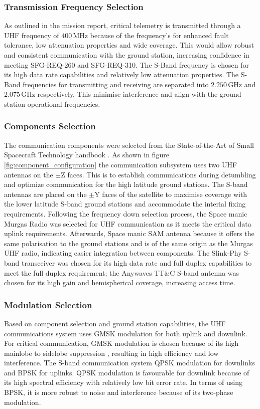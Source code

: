 \documentclass[a4paper, 11pt, conference]{IEEEtran}
\begin{document}
\subsubsection{Transmission Frequency Selection}
As outlined in the mission report, critical telemetry is transmitted through a UHF frequency of $400\,\mathrm{MHz}$  because of the frequency's for enhanced fault tolerance, low attenuation properties and wide coverage. This would allow robust and consistent communication with the ground station, increasing confidence in meeting SFG-REQ-260 and SFG-REQ-310. The S-Band frequency is chosen for its high data rate capabilities and relatively low attenuation properties. The S-Band frequencies for transmitting and receiving are separated into $2.250\,\mathrm{GHz}$ and $2.075\,\mathrm{GHz}$ respectively. This minimise interference and align with the ground station operational frequencies.
\subsubsection{Components Selection}
The communication components were selected from the State-of-the-Art of Small Spacecraft Technology handbook \cite{nasaCommunicationsNASA}. As shown in figure \ref{fig:component_configuration} the communication subsystem uses two UHF antennas on the $\pm$Z faces. This is to establish communications during detumbling and optimize communication for the high latitude ground stations. The S-band antennas are placed on the $\pm$Y faces of the satellite to maximise coverage with the lower latitude S-band ground stations and accommodate the interial fixing requirements. Following the frequency down selection process, the Space manic Murgas Radio was selected for UHF communication as it meets the critical data uplink requirements. Afterwards, Space manic SAM antenna because it offers the same polarisation to the ground stations and is of the same origin as the Murgas UHF radio, indicating easier integration between components. The Slink-Phy S-band transceiver was chosen for its high data rate and full duplex capabilities to meet the full duplex requirement; the Anywaves TT\&C S-band antenna was chosen for its high gain and hemispherical coverage, increasing access time.
\subsubsection{Modulation Selection}
Based on component selection and ground station capabilities, the UHF communications system uses GMSK modulation for both uplink and downlink. For critical communication, GMSK modulation is chosen because of its high mainlobe to sidelobe suppression \cite{wertz_space_1999}, resulting in high efficiency and low interference. The S-band communication system QPSK modulation for downlinks and BPSK for uplinks. QPSK modulation is favourable for downlink because of its high spectral efficiency with relatively low bit error rate. In terms of using BPSK, it is more robust to noise and interference because of its two-phase modulation. 
\end{document}
